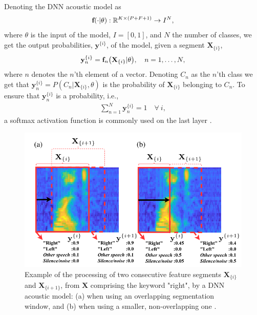 Denoting the DNN acoustic model as 
\begin{align}
    \textbf{f}\qty(\cdot|\theta): \mathbb{R}^{K\times (P+F+1)} \rightarrow I^N, 
\end{align}
where \(\theta\) is the input of the model, \(I = [0,1]\), and \(N\) the number of classes, we get the output probabilities, \(\textbf{y}^{\{i\}}\), of the model, given a segment \(\textbf{X}_{\{i\}}\),
\begin{align}
    \textbf{y}_n^{\{i\}} = \textbf{f}_n\qty(\textbf{X}_{\{i\}}|\theta), \quad n = 1, \dots, N,
\end{align}
where \(n\) denotes the \(n\)'th element of a vector. Denoting \(C_n\) as the \(n\)'th class we get that \(\textbf{y}_n^{\{i\}} = P(C_n|\textbf{X}_{\{i\}}, \theta)\) is the probability of \(\textbf{X}_{\{i\}}\) belonging to \(C_n\). To ensure that \(\textbf{y}_n^{\{i\}}\) is a probability, i.e., 
\begin{align}
    \sum_{n=1}^N \textbf{y}_n^{\{i\}} = 1 \quad \forall \ i,
\end{align}
a softmax activation function \cite{rothman2020artificial} is commonly used on the last layer \cite{lopez2021deep}.

\begin{figure}[h]
    \centering
    \includegraphics[width=\textwidth]{incl/img/kws/acoustic_model.png}
    \caption{Example of the processing of two consecutive feature segments \(\textbf{X}_{\{i\}}\) and \(\textbf{X}_{\{i +1\}}\), from \(\textbf{X}\) comprising the keyword "right", by a DNN acoustic model: (a) when using an overlapping segmentation window, and (b) when using a smaller, non-overlapping one \cite{lopez2021deep}. }
    \label{fig:acoustic_model}
\end{figure}

